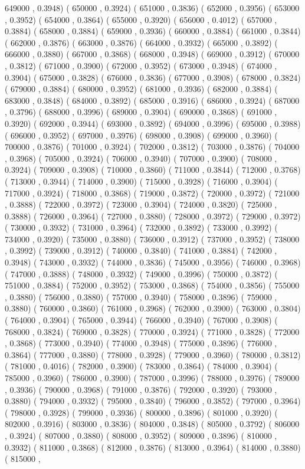 \documentclass[10pt]{article}
\begin{document}
649000 , 0.3948)  ( 650000 , 0.3924)  ( 651000 , 0.3836)  ( 652000 , 0.3956)  ( 653000 , 0.3952)  ( 654000 , 0.3864)  ( 655000 , 0.3920)  ( 656000 , 0.4012)  ( 657000 , 0.3884)  ( 658000 , 0.3884)  ( 659000 , 0.3936)  ( 660000 , 0.3884)  ( 661000 , 0.3844)  ( 662000 , 0.3876)  ( 663000 , 0.3876)  ( 664000 , 0.3932)  ( 665000 , 0.3892)  ( 666000 , 0.3880)  ( 667000 , 0.3868)  ( 668000 , 0.3948)  ( 669000 , 0.3912)  ( 670000 , 0.3812)  ( 671000 , 0.3900)  ( 672000 , 0.3952)  ( 673000 , 0.3948)  ( 674000 , 0.3904)  ( 675000 , 0.3828)  ( 676000 , 0.3836)  ( 677000 , 0.3908)  ( 678000 , 0.3824)  ( 679000 , 0.3884)  ( 680000 , 0.3952)  ( 681000 , 0.3936)  ( 682000 , 0.3884)  ( 683000 , 0.3848)  ( 684000 , 0.3892)  ( 685000 , 0.3916)  ( 686000 , 0.3924)  ( 687000 , 0.3796)  ( 688000 , 0.3996)  ( 689000 , 0.3904)  ( 690000 , 0.3868)  ( 691000 , 0.3920)  ( 692000 , 0.3944)  ( 693000 , 0.3892)  ( 694000 , 0.3996)  ( 695000 , 0.3988)  ( 696000 , 0.3952)  ( 697000 , 0.3976)  ( 698000 , 0.3908)  ( 699000 , 0.3960)  ( 700000 , 0.3876)  ( 701000 , 0.3924)  ( 702000 , 0.3812)  ( 703000 , 0.3876)  ( 704000 , 0.3968)  ( 705000 , 0.3924)  ( 706000 , 0.3940)  ( 707000 , 0.3900)  ( 708000 , 0.3924)  ( 709000 , 0.3908)  ( 710000 , 0.3860)  ( 711000 , 0.3844)  ( 712000 , 0.3768)  ( 713000 , 0.3944)  ( 714000 , 0.3900)  ( 715000 , 0.3928)  ( 716000 , 0.3904)  ( 717000 , 0.3924)  ( 718000 , 0.3868)  ( 719000 , 0.3872)  ( 720000 , 0.3972)  ( 721000 , 0.3888)  ( 722000 , 0.3972)  ( 723000 , 0.3904)  ( 724000 , 0.3820)  ( 725000 , 0.3888)  ( 726000 , 0.3964)  ( 727000 , 0.3880)  ( 728000 , 0.3972)  ( 729000 , 0.3972)  ( 730000 , 0.3932)  ( 731000 , 0.3964)  ( 732000 , 0.3892)  ( 733000 , 0.3992)  ( 734000 , 0.3920)  ( 735000 , 0.3880)  ( 736000 , 0.3912)  ( 737000 , 0.3952)  ( 738000 , 0.3992)  ( 739000 , 0.3912)  ( 740000 , 0.3840)  ( 741000 , 0.3884)  ( 742000 , 0.3948)  ( 743000 , 0.3932)  ( 744000 , 0.3836)  ( 745000 , 0.3956)  ( 746000 , 0.3968)  ( 747000 , 0.3888)  ( 748000 , 0.3932)  ( 749000 , 0.3996)  ( 750000 , 0.3872)  ( 751000 , 0.3884)  ( 752000 , 0.3952)  ( 753000 , 0.3868)  ( 754000 , 0.3856)  ( 755000 , 0.3880)  ( 756000 , 0.3880)  ( 757000 , 0.3940)  ( 758000 , 0.3896)  ( 759000 , 0.3880)  ( 760000 , 0.3860)  ( 761000 , 0.3968)  ( 762000 , 0.3900)  ( 763000 , 0.3804)  ( 764000 , 0.3904)  ( 765000 , 0.3944)  ( 766000 , 0.3940)  ( 767000 , 0.3908)  ( 768000 , 0.3824)  ( 769000 , 0.3828)  ( 770000 , 0.3924)  ( 771000 , 0.3828)  ( 772000 , 0.3868)  ( 773000 , 0.3940)  ( 774000 , 0.3948)  ( 775000 , 0.3896)  ( 776000 , 0.3864)  ( 777000 , 0.3880)  ( 778000 , 0.3928)  ( 779000 , 0.3960)  ( 780000 , 0.3812)  ( 781000 , 0.4016)  ( 782000 , 0.3900)  ( 783000 , 0.3864)  ( 784000 , 0.3904)  ( 785000 , 0.3960)  ( 786000 , 0.3900)  ( 787000 , 0.3996)  ( 788000 , 0.3976)  ( 789000 , 0.3936)  ( 790000 , 0.3968)  ( 791000 , 0.3876)  ( 792000 , 0.3920)  ( 793000 , 0.3880)  ( 794000 , 0.3932)  ( 795000 , 0.3840)  ( 796000 , 0.3852)  ( 797000 , 0.3964)  ( 798000 , 0.3928)  ( 799000 , 0.3936)  ( 800000 , 0.3896)  ( 801000 , 0.3920)  ( 802000 , 0.3916)  ( 803000 , 0.3836)  ( 804000 , 0.3848)  ( 805000 , 0.3792)  ( 806000 , 0.3924)  ( 807000 , 0.3880)  ( 808000 , 0.3952)  ( 809000 , 0.3896)  ( 810000 , 0.3932)  ( 811000 , 0.3868)  ( 812000 , 0.3876)  ( 813000 , 0.3964)  ( 814000 , 0.3880)  ( 815000 , 
\end{document}
